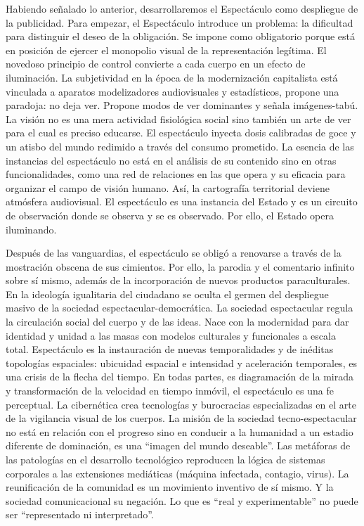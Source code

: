 Habiendo señalado lo anterior, desarrollaremos el Espectáculo como despliegue de la publicidad. Para empezar, el Espectáculo introduce un problema: la dificultad para distinguir el deseo de la obligación. Se impone como obligatorio porque está en posición de ejercer el monopolio visual de la representación legítima. El novedoso principio de control convierte a cada cuerpo en un efecto de iluminación. La subjetividad en la época de la modernización capitalista está vinculada a aparatos modelizadores audiovisuales y estadísticos, propone una paradoja: no deja ver. Propone modos de ver dominantes y señala imágenes-tabú. La visión no es una mera actividad fisiológica social sino también un arte de ver para el cual es preciso educarse. El espectáculo inyecta dosis calibradas de goce y un atisbo del mundo redimido a través del consumo prometido. La esencia de las instancias del espectáculo no está en el análisis de su contenido sino en otras funcionalidades, como una red de relaciones en las que opera y su eficacia para organizar el campo de visión humano. Así, la cartografía territorial deviene atmósfera audiovisual. El espectáculo es una instancia del Estado y es un circuito de observación donde se observa y se es observado. Por ello, el Estado opera iluminando.

Después de las vanguardias, el espectáculo se obligó a renovarse a través de la mostración obscena de sus cimientos. Por ello, la parodia y el comentario infinito sobre sí mismo, además de la incorporación de nuevos productos paraculturales. En la ideología igualitaria del ciudadano se oculta el germen del despliegue masivo de la sociedad espectacular-democrática. La sociedad espectacular regula la circulación social del cuerpo y de las ideas. Nace con la modernidad para dar identidad y unidad a las masas con modelos culturales y funcionales a escala total. Espectáculo es la instauración de nuevas temporalidades y de inéditas topologías espaciales: ubicuidad espacial e intensidad y aceleración temporales, es una crisis de la flecha del tiempo. En todas partes, es diagramación de la mirada y transformación de la velocidad en tiempo inmóvil, el espectáculo es una fe perceptual. La cibernética crea tecnologías y burocracias especializadas en el arte de la vigilancia visual de los cuerpos. La misión de la sociedad tecno-espectacular no está en relación con el progreso sino en conducir a la humanidad a un estadio diferente de dominación, es una \enquote{imagen del mundo deseable}. Las metáforas de las patologías en el desarrollo tecnológico reproducen la lógica de sistemas corporales a las extensiones mediáticas (máquina infectada, contagio, virus). La reunificación de la comunidad es un movimiento inventivo de sí mismo. Y la sociedad comunicacional su negación. Lo que es \enquote{real y experimentable} no puede ser \enquote{representado ni interpretado}.

